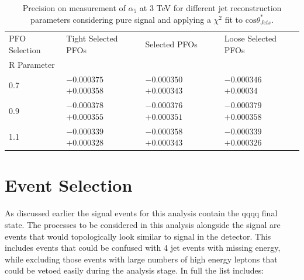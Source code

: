 \begin{table}[h!]
\centering
\begin{tabular}{l l l l}
\hline
PFO Selection & Tight Selected PFOs & Selected PFOs & Loose Selected PFOs \\ 
R Parameter & & & \\ 
\hline
0.7 & $-0.000375$ $+0.000358$ & $-0.000350$ $+0.000343$ & $-0.000346$ $+0.00034$ \\
0.9 & $-0.000378$ $+0.000355$ & $-0.000376$ $+0.000351$ & $-0.000379$ $+0.000358$ \\
1.1 & $-0.000339$ $+0.000328$ & $-0.000358$ $+0.000343$ & $-0.000339$ $+0.000326$ \\
\hline
\end{tabular}
\caption[$1\sigma$ precision on measurement of $\alpha_{5}$ for different jet reconstruction parameters considering pure signal at 3 TeV.]{Precision on measurement of $\alpha_{5}$ at 3 TeV for different jet reconstruction parameters considering pure signal and applying a $\chi^{2}$ fit to $\text{cos}\theta^{*}_{Jets}$.}
\label{table:precisiona5signaljetalgo3000GeV}
\end{table}

\section{Event Selection}
As discussed earlier the signal events for this analysis contain the \nu{\nu}qqqq final state. The processes to be considered in this analysis alongside the signal are events that would topologically look similar to signal in the detector. This includes events that could be confused with 4 jet events with missing energy, while excluding those events with large numbers of high energy leptons that could be vetoed easily during the analysis stage. In full the list includes:

